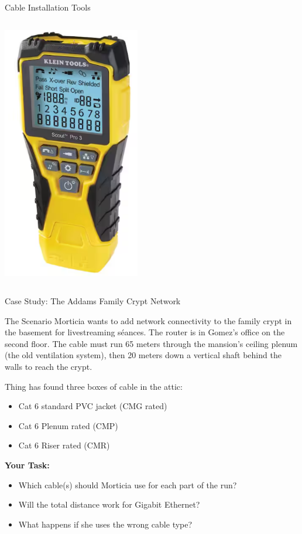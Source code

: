 \documentclass[aspectratio=169]{beamer}
\begin{document}
\begin{frame}{Cable Installation Tools}
\begin{columns}[T]
\begin{column}{0.4\textwidth}
            \vspace{0.2cm}
            \includegraphics[width=0.45\textwidth]{cable_tester.png}
        \end{column}
    \end{columns}
\end{frame}

\begin{frame}{Case Study: The Addams Family Crypt Network}
    \begin{block}{The Scenario}
        \scriptsize
        Morticia wants to add network connectivity to the family crypt in the basement for livestreaming séances. The router is in Gomez's office on the second floor. The cable must run 65 meters through the mansion's ceiling plenum (the old ventilation system), then 20 meters down a vertical shaft behind the walls to reach the crypt.
        
        \vspace{0.3cm}
        Thing has found three boxes of cable in the attic:
        \begin{itemize}
            \item Cat 6 standard PVC jacket (CMG rated)
            \item Cat 6 Plenum rated (CMP) 
            \item Cat 6 Riser rated (CMR)
        \end{itemize}
    \end{block}
    
    \vspace{0.3cm}
    \textbf{Your Task:}
    \begin{itemize}
        \item Which cable(s) should Morticia use for each part of the run?
        \item Will the total distance work for Gigabit Ethernet?
        \item What happens if she uses the wrong cable type?
    \end{itemize}
\end{frame}
\end{document}
